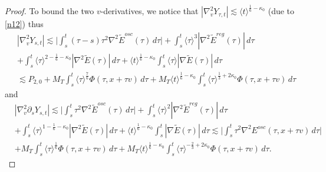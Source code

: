 \documentclass[reqno,11pt]{amsart}
\numberwithin{equation}{section}
\begin{document}
\begin{proof}
	To bound the two $v$-derivatives, we notice that $|\nabla_v^2Y_{\tau,t}|\lesssim \langle t\rangle^{\frac16-\kappa_0}$ (due to \eqref{n12}) thus
	\begin{equation}\label{Ysu6}
		\begin{split}
			&|\nabla_v^2Y_{s,t}|\lesssim\Big|\int_s^t(\tau-s)\tau^2\nabla^2\widetilde E^{osc}(\tau)\,d\tau\Big|
			+\int_s^t\langle\tau\rangle^3|\nabla^2\widetilde E^{reg}(\tau)|\,d\tau\\
			&+\int_s^t\langle\tau\rangle^{2-\frac16-\kappa_0}|\nabla^2\widetilde E(\tau)|\,d\tau+
			\langle t\rangle^{\frac16-\kappa_0}\int_s^t\langle\tau\rangle|\nabla\widetilde E(\tau)|\,d\tau\\
			&\lesssim
			P_{2,0}+M_T\int_s^t
			\langle\tau\rangle^{\frac76}
			\Phi(\tau,x+\tau v)\,d\tau+	M_T\langle t\rangle^{\frac16-\kappa_0}
			\int_s^t
			\langle\tau\rangle^{\frac13+2\kappa_0}
			\Phi(\tau,x+\tau v)\,d\tau
		\end{split}
	\end{equation}
	and
	\begin{equation}\label{Ysu7}
		\begin{split}
			&|\nabla_v^2\partial_sY_{s,t}|\lesssim\Big|\int_s^t\tau^2\nabla^2\widetilde E^{osc}(\tau)\,d\tau\Big|
			+\int_s^t\langle\tau\rangle^2|\nabla^2\widetilde E^{reg}(\tau)|\,d\tau\\
			&+\int_s^t\langle\tau\rangle^{1-\frac16-\kappa_0}|\nabla^2\widetilde E(\tau)|\,d\tau+
			\langle t\rangle^{\frac16-\kappa_0}
			\int_s^t|\nabla\widetilde E(\tau)|\,d\tau\lesssim\Big|\int_s^t\tau^2\nabla^2E^{osc}(\tau,x+\tau v)\,d\tau\Big|\\
			&+M_T\int_s^t\langle\tau\rangle^{\frac16}\Phi(\tau,x+\tau v)\,d\tau+M_T\langle t\rangle^{\frac16-\kappa_0}\int_s^t\langle\tau\rangle^{-\frac23+2\kappa_0}\Phi(\tau,x+\tau v)\,d\tau.
		\end{split}
	\end{equation}
	

\end{proof}
\end{document}
